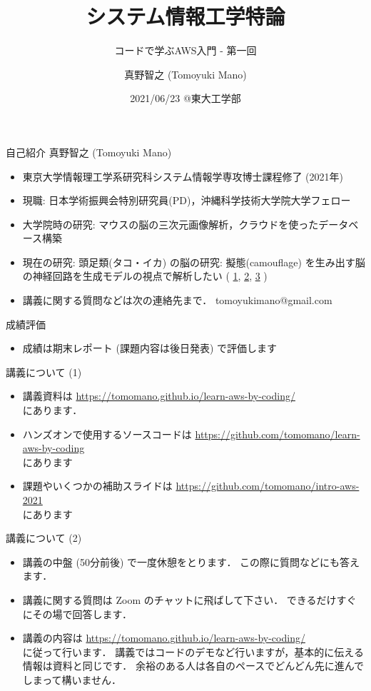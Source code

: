 \documentclass[unicode,11pt]{beamer}
\title{システム情報工学特論}
\subtitle{コードで学ぶAWS入門 - 第一回}
\author{真野智之 (Tomoyuki Mano)}
\institute[OIST]{Okinawa Institute of Science and Technology}
\date{2021/06/23 @東大工学部}
\begin{document}
\frame{\titlepage}

\begin{frame}{自己紹介}
真野智之 (Tomoyuki Mano)
\begin{itemize}
    \item 東京大学情報理工学系研究科システム情報学専攻博士課程修了 (2021年)
    \item 現職: 日本学術振興会特別研究員(PD)，沖縄科学技術大学院大学フェロー
    \item 大学院時の研究: マウスの脳の三次元画像解析，クラウドを使ったデータベース構築
    \item 現在の研究: 頭足類(タコ・イカ) の脳の研究: 擬態(camouflage) を生み出す脳の神経回路を生成モデルの視点で解析したい
    (
    \href{https://twitter.com/CephWarden/status/1142083856893263872}{1},
    \href{https://twitter.com/CephWarden/status/1384644335069667334}{2},
    \href{https://twitter.com/CephWarden/status/1232307456346181632}{3}
    )
    \item 講義に関する質問などは次の連絡先まで． tomoyukimano@gmail.com
\end{itemize}
\end{frame}

\begin{frame}{成績評価}
\begin{itemize}
    \item 成績は期末レポート (課題内容は後日発表) で評価します
\end{itemize}
\end{frame}

\begin{frame}{講義について (1)}
\begin{itemize}
    \item 講義資料は
    \url{https://tomomano.github.io/learn-aws-by-coding/}\\
    にあります．
    \item ハンズオンで使用するソースコードは \url{https://github.com/tomomano/learn-aws-by-coding}\\
    にあります
    \item 課題やいくつかの補助スライドは
    \url{https://github.com/tomomano/intro-aws-2021}\\
    にあります
\end{itemize}
\end{frame}

\begin{frame}{講義について (2)}
\begin{itemize}
    \item 講義の中盤 (50分前後) で一度休憩をとります．
    この際に質問などにも答えます．
    \item 講義に関する質問は Zoom のチャットに飛ばして下さい．
    できるだけすぐにその場で回答します．
    \item 講義の内容は
    \url{https://tomomano.github.io/learn-aws-by-coding/}\\
    に従って行います．
    講義ではコードのデモなど行いますが，基本的に伝える情報は資料と同じです．
    余裕のある人は各自のペースでどんどん先に進んでしまって構いません．
\end{itemize}

\end{frame}
\end{document}
